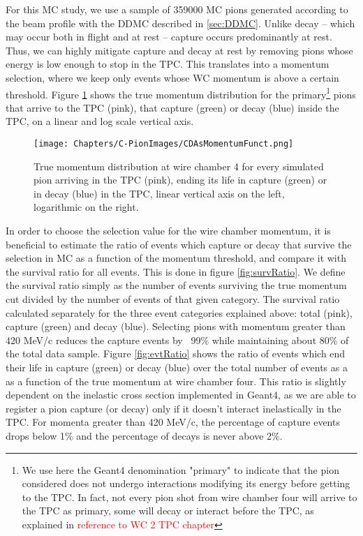 For this MC study, we use a sample of 359000 MC pions generated according to the beam profile with the DDMC described in \ref{sec:DDMC}. Unlike decay -- which may occur both in flight and at rest -- capture occurs predominantly
at rest. Thus, we can highly mitigate capture and decay at rest by removing pions whose energy is low enough to stop in the TPC. This translates into a momentum selection, where we keep only events whose WC momentum is above a certain threshold. 
Figure \ref{fig:CaptureMom} shows the true momentum distribution for the primary\footnote{We use here the Geant4 denomination "primary" to indicate that the pion considered does not undergo interactions modifying its energy before getting to the TPC. In fact, not every pion shot from wire chamber four will arrive to the TPC as primary,  some will decay or interact before the TPC, as explained in \textcolor{red}{reference to WC 2 TPC chapter}} pions that arrive to the TPC (pink), that capture (green) or decay (blue) inside the TPC, on a linear and log scale vertical axis. 

\begin{figure}[hpbt]
\centering
\texttt{[image: Chapters/C-PionImages/CDAsMomentumFunct.png]}
\caption{True momentum distribution at wire chamber 4 for every simulated pion arriving in the TPC (pink), ending its life in capture (green) or in decay (blue) in the TPC, linear vertical axis on the left, logarithmic on the right. }
\label{fig:CaptureMom}
\end{figure}


In order to choose the selection value for the wire chamber momentum, it is beneficial to estimate the ratio of events which capture or decay that survive the selection in MC as a function of the momentum threshold, and compare it with the survival ratio for all events. This is done in figure \ref{fig:survRatio}. We define the survival ratio simply  as the number of events surviving the true momentum cut divided by the number of events of that given category. The survival ratio calculated separately for the three event categories explained above: total (pink), capture (green) and decay (blue).
Selecting pions with momentum greater than 420 MeV/c reduces the capture events by ~99\% while maintaining about 80\% of the total data sample. 
Figure \ref{fig:evtRatio} shows the ratio of events which end their life in capture (green) or decay (blue) over the total number of events as a as a function of the true momentum at wire chamber four. This ratio is slightly dependent on the inelastic cross section implemented in Geant4, as we are able to register a pion capture (or decay) only if it doesn't interact inelastically in the TPC. For momenta greater than 420 MeV/c, the percentage of capture events drops below 1\% and the percentage of decays is never above 2\%.


